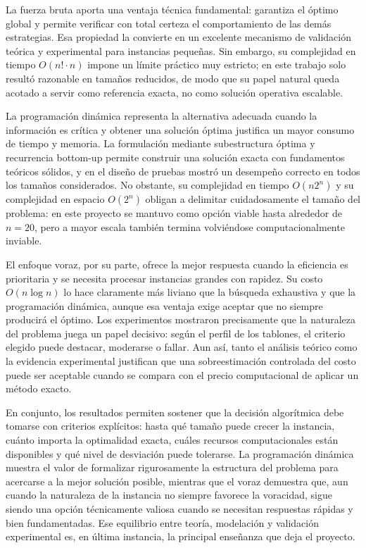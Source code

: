 \documentclass[12pt,a4paper]{article}
\begin{document}
La fuerza bruta aporta una ventaja t\'ecnica fundamental: garantiza el \'optimo global y permite verificar con total certeza el comportamiento de las dem\'as estrategias. Esa propiedad la convierte en un excelente mecanismo de validaci\'on te\'orica y experimental para instancias peque\~nas. Sin embargo, su complejidad en tiempo \(O(n! \cdot n)\) impone un l\'imite pr\'actico muy estricto; en este trabajo solo result\'o razonable en tama\~nos reducidos, de modo que su papel natural queda acotado a servir como referencia exacta, no como soluci\'on operativa escalable.

La programaci\'on din\'amica representa la alternativa adecuada cuando la informaci\'on es cr\'itica y obtener una soluci\'on \'optima justifica un mayor consumo de tiempo y memoria. La formulaci\'on mediante subestructura \'optima y recurrencia bottom-up permite construir una soluci\'on exacta con fundamentos te\'oricos s\'olidos, y en el dise\~no de pruebas mostr\'o un desempe\~no correcto en todos los tama\~nos considerados. No obstante, su complejidad en tiempo \(O(n2^n)\) y su complejidad en espacio \(O(2^n)\) obligan a delimitar cuidadosamente el tama\~no del problema: en este proyecto se mantuvo como opci\'on viable hasta alrededor de \(n=20\), pero a mayor escala tambi\'en termina volvi\'endose computacionalmente inviable.

El enfoque voraz, por su parte, ofrece la mejor respuesta cuando la eficiencia es prioritaria y se necesita procesar instancias grandes con rapidez. Su costo \(O(n \log n)\) lo hace claramente m\'as liviano que la b\'usqueda exhaustiva y que la programaci\'on din\'amica, aunque esa ventaja exige aceptar que no siempre producir\'a el \'optimo. Los experimentos mostraron precisamente que la naturaleza del problema juega un papel decisivo: seg\'un el perfil de los tablones, el criterio elegido puede destacar, moderarse o fallar. Aun as\'i, tanto el an\'alisis te\'orico como la evidencia experimental justifican que una sobreestimaci\'on controlada del costo puede ser aceptable cuando se compara con el precio computacional de aplicar un m\'etodo exacto.

En conjunto, los resultados permiten sostener que la decisi\'on algor\'itmica debe tomarse con criterios expl\'icitos: hasta qu\'e tama\~no puede crecer la instancia, cu\'anto importa la optimalidad exacta, cu\'ales recursos computacionales est\'an disponibles y qu\'e nivel de desviaci\'on puede tolerarse. La programaci\'on din\'amica muestra el valor de formalizar rigurosamente la estructura del problema para acercarse a la mejor soluci\'on posible, mientras que el voraz demuestra que, aun cuando la naturaleza de la instancia no siempre favorece la voracidad, sigue siendo una opci\'on t\'ecnicamente valiosa cuando se necesitan respuestas r\'apidas y bien fundamentadas. Ese equilibrio entre teor\'ia, modelaci\'on y validaci\'on experimental es, en \'ultima instancia, la principal ense\~nanza que deja el proyecto.
\end{document}
